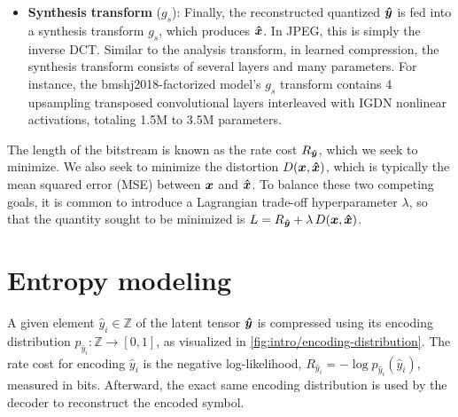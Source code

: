 \begin{itemize}
  \item \textbf{Synthesis transform} ($g_s$):
    Finally, the reconstructed quantized ${\boldsymbol{\hat{y}}}$ is fed into a synthesis transform $g_s$, which produces ${\boldsymbol{\hat{x}}}$.
    In JPEG, this is simply the inverse DCT.
    Similar to the analysis transform, in learned compression, the synthesis transform consists of several layers and many parameters.
    For instance, the bmshj2018-factorized model's $g_s$ transform contains 4 upsampling transposed convolutional layers interleaved with IGDN nonlinear activations, totaling 1.5M to 3.5M parameters.
\end{itemize}

The length of the bitstream is known as the rate cost $R_{{\boldsymbol{\hat{y}}}}$, which we seek to minimize. %
We also seek to minimize the distortion $D({\boldsymbol{x}}, {\boldsymbol{\hat{x}}})$, which is typically the mean squared error (MSE) between ${\boldsymbol{x}}$ and ${\boldsymbol{\hat{x}}}$.
To balance these two competing goals, it is common to introduce a Lagrangian trade-off hyperparameter $\lambda$, so that the quantity sought to be minimized is $L = R_{{\boldsymbol{\hat{y}}}} + \lambda \, D({\boldsymbol{x}}, {\boldsymbol{\hat{x}}})$.



%
%




\section{Entropy modeling}

A given element $\hat{y}_i \in \mathbb{Z}$ of the latent tensor ${\boldsymbol{\hat{y}}}$ is compressed using its encoding distribution $p_{{\hat{y}}_i} : \mathbb{Z} \to [0, 1]$, as visualized in \cref{fig:intro/encoding-distribution}.
The rate cost for encoding $\hat{y}_i$ is the negative log-likelihood, $R_{{\hat{y}}_i} = -\log p_{{\hat{y}}_i}({\hat{y}}_i)$, measured in bits.
Afterward, the exact same encoding distribution is used by the decoder to reconstruct the encoded symbol.


